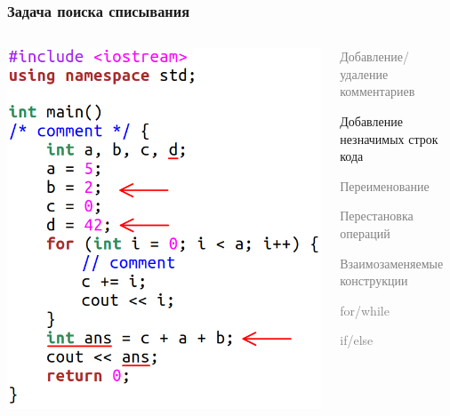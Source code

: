 \documentclass[10pt]{beamer}
\begin{document}
\begin{frame}[fragile]\frametitle{Задача поиска списывания}
	\centering
	\begin{columns}
		\centering
		\includegraphics[scale=0.7]{insert.png}
		
		\centering
		\begin{itemize}
			\item \textcolor{gray}{Добавление/удаление комментариев}
				\item Добавление незначимых строк кода
				\textcolor{gray}{
				\item Переименование
				\item Перестановка операций
				\item Взаимозаменяемые конструкции
			}
			\begin{itemize}
				\item \textcolor{gray}{for/while
					\item if/else
				}
			\end{itemize}
		\end{itemize}
	\end{columns}
\end{frame}
\end{document}

